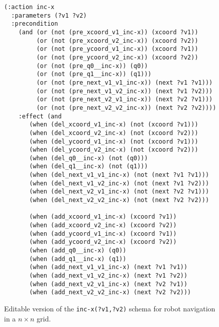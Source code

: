 \documentclass[letterpaper]{article} %
\begin{document}
\begin{figure}
  \begin{tiny}  
  \begin{verbatim}
(:action inc-x
  :parameters (?v1 ?v2)
  :precondition
    (and (or (not (pre_xcoord_v1_inc-x)) (xcoord ?v1))
         (or (not (pre_xcoord_v2_inc-x)) (xcoord ?v2))
         (or (not (pre_ycoord_v1_inc-x)) (xcoord ?v1))                       
         (or (not (pre_ycoord_v2_inc-x)) (xcoord ?v2))
         (or (not (pre_q0__inc-x)) (q0))
         (or (not (pre_q1__inc-x)) (q1)))
         (or (not (pre_next_v1_v1_inc-x)) (next ?v1 ?v1)))
         (or (not (pre_next_v1_v2_inc-x)) (next ?v1 ?v2)))
         (or (not (pre_next_v2_v1_inc-x)) (next ?v2 ?v1)))
         (or (not (pre_next_v2_v2_inc-x)) (next ?v2 ?v2))))
    :effect (and
       (when (del_xcoord_v1_inc-x) (not (xcoord ?v1)))
       (when (del_xcoord_v2_inc-x) (not (xcoord ?v2)))
       (when (del_ycoord_v1_inc-x) (not (xcoord ?v1)))
       (when (del_ycoord_v2_inc-x) (not (xcoord ?v2)))
       (when (del_q0__inc-x) (not (q0)))
       (when (del_q1__inc-x) (not (q1)))
       (when (del_next_v1_v1_inc-x) (not (next ?v1 ?v1)))
       (when (del_next_v1_v2_inc-x) (not (next ?v1 ?v2)))
       (when (del_next_v2_v1_inc-x) (not (next ?v2 ?v1)))
       (when (del_next_v2_v2_inc-x) (not (next ?v2 ?v2)))
       
       (when (add_xcoord_v1_inc-x) (xcoord ?v1))
       (when (add_xcoord_v2_inc-x) (xcoord ?v2))
       (when (add_ycoord_v1_inc-x) (xcoord ?v1))
       (when (add_ycoord_v2_inc-x) (xcoord ?v2))
       (when (add_q0__inc-x) (q0))
       (when (add_q1__inc-x) (q1))
       (when (add_next_v1_v1_inc-x) (next ?v1 ?v1))
       (when (add_next_v1_v2_inc-x) (next ?v1 ?v2))
       (when (add_next_v2_v1_inc-x) (next ?v2 ?v1))
       (when (add_next_v2_v2_inc-x) (next ?v2 ?v2)))
  \end{verbatim}           
  \end{tiny}  
 \caption{\small Editable version of the {\tt\small inc-x(?v1,?v2)} schema for robot navigation in a $n\times n$ grid.}
\label{fig:editable}
\end{figure}
\end{document}
